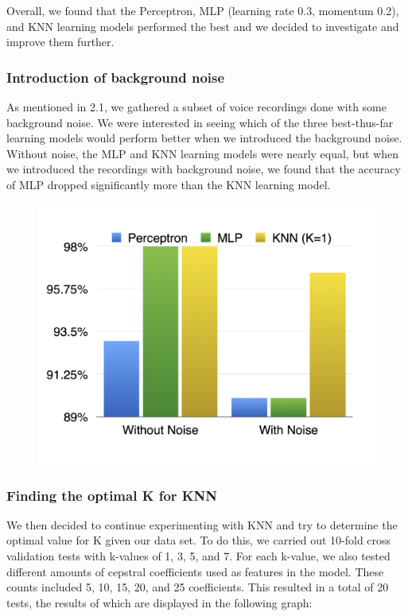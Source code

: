 \documentclass{article}
\begin{document}
Overall, we found that the Perceptron, MLP (learning rate 0.3, momentum 0.2), and KNN learning models performed the best and we decided to investigate and improve them further.

\subsubsection{Introduction of background noise}

As mentioned in 2.1, we gathered a subset of voice recordings done with some background noise. We were interested in seeing which of the three best-thus-far learning models would perform better when we introduced the background noise. Without noise, the MLP and KNN learning models were nearly equal, but when we introduced the recordings with background noise, we found that the accuracy of MLP dropped significantly more than the KNN learning model.

\begin{figure}[H]
\includegraphics[width=\linewidth]{WithNoise_comparison}
\end{figure}

\subsubsection{Finding the optimal K for KNN}

We then decided to continue experimenting with KNN and try to determine the optimal value for K given our data set.  To do this, we carried out 10-fold cross validation tests with k-values of 1, 3, 5, and 7.  For each k-value, we also tested different amounts of cepstral coefficients used as features in the model.  These counts included 5, 10, 15, 20, and 25 coefficients.  This resulted in a total of 20 tests, the results of which are displayed in the following graph:
\end{document}
